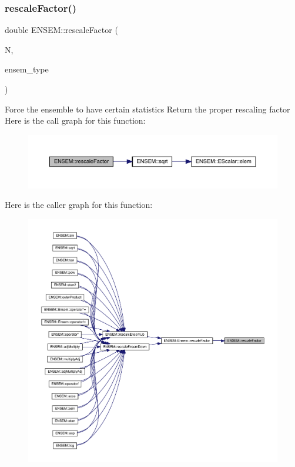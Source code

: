\subsubsection{\texorpdfstring{rescaleFactor()}{rescaleFactor()}}
{\footnotesize\ttfamily double E\+N\+S\+E\+M\+::rescale\+Factor (\begin{DoxyParamCaption}\item[{int}]{N,  }\item[{\mbox{\hyperlink{namespaceENSEM_a2dc2c4a26884f343471e52f23479ddbe}{Ensem\+Type\+\_\+t}}}]{ensem\+\_\+type }\end{DoxyParamCaption})\hspace{0.3cm}{\ttfamily [inline]}}

Force the ensemble to have certain statistics Return the proper rescaling factor Here is the call graph for this function\+:\nopagebreak
\begin{figure}[H]
\begin{center}
\leavevmode
\includegraphics[width=350pt]{d1/d9e/group__eensem_ga01418f9a0c64b71fae7f8d400a68f25e_cgraph}
\end{center}
\end{figure}
Here is the caller graph for this function\+:\nopagebreak
\begin{figure}[H]
\begin{center}
\leavevmode
\includegraphics[width=350pt]{d1/d9e/group__eensem_ga01418f9a0c64b71fae7f8d400a68f25e_icgraph}
\end{center}
\end{figure}
\mbox{\label{group__eensem_ga92fac3bc9ad6164daf90b83052f0d48e}} 
